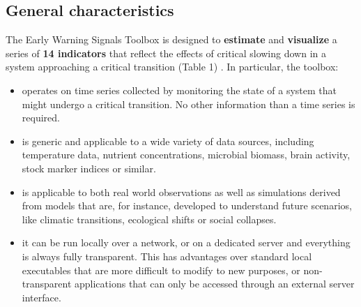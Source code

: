 \documentclass[12pt,a4paper,final]{article}
\begin{document}
\begin{doublespacing}
\subsection{General characteristics}
The Early Warning Signals Toolbox is designed to \textbf{estimate} and \textbf{visualize} a series of \textbf{14 indicators} that reflect the effects of critical slowing down in a system approaching a critical transition (Table 1) \cite{Dakos2012a}. In particular, the toolbox:
\begin{itemize}
\item operates on time series collected by monitoring the state of a system that might undergo a critical transition. No other information than a time series is required. 
\item is generic and applicable to a wide variety of data sources, including temperature data, nutrient concentrations, microbial biomass, brain activity, stock marker indices or similar.
\item is applicable to both real world observations as well as simulations derived from models that are, for instance, developed to understand future scenarios, like climatic transitions, ecological shifts or social collapses.
\item it can be run locally over a network, or on a dedicated server and everything is always fully transparent. This has advantages over standard local executables that are more difficult to modify to new purposes, or non-transparent applications that can only be accessed through an external server interface.
\end{itemize}



\end{doublespacing}
\end{document}
